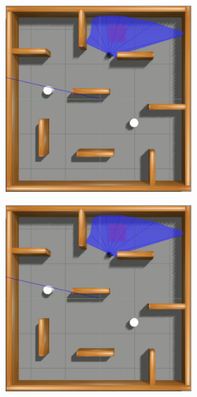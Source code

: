 \begin{figure}[H]
\begin{center}
\begin{subfigure}[b]{0.60\textwidth}
\begin{subfigure}[b]{0.24\textwidth}
        \end{subfigure}
        \hfill
        \begin{subfigure}[b]{0.24\textwidth}
            \includegraphics[width=\textwidth]{imagens/simulated_envs/sim_env3_ddpg/7.png}
        \end{subfigure}
        \hfill
        \begin{subfigure}[b]{0.24\textwidth}
            \includegraphics[width=\textwidth]{imagens/simulated_envs/sim_env3_ddpg/7.png}

\end{subfigure}
\end{subfigure}
\end{center}
\end{figure}
